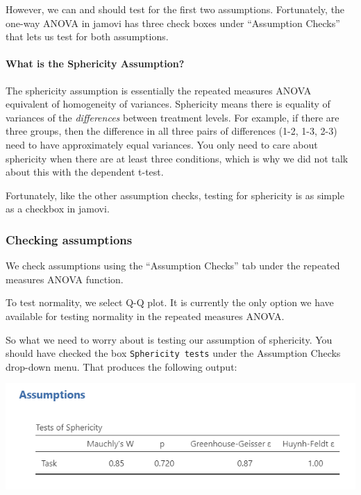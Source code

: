 \documentclass[
]{book}
\begin{document}
However, we can and should test for the first two assumptions. Fortunately, the one-way ANOVA in jamovi has three check boxes under ``Assumption Checks'' that lets us test for both assumptions.

\hypertarget{what-is-the-sphericity-assumption}{%
\paragraph{What is the Sphericity Assumption?}\label{what-is-the-sphericity-assumption}}

The sphericity assumption is essentially the repeated measures ANOVA equivalent of homogeneity of variances. Sphericity means there is equality of variances of the \emph{differences} between treatment levels. For example, if there are three groups, then the difference in all three pairs of differences (1-2, 1-3, 2-3) need to have approximately equal variances. You only need to care about sphericity when there are at least three conditions, which is why we did not talk about this with the dependent t-test.

Fortunately, like the other assumption checks, testing for sphericity is as simple as a checkbox in jamovi.

\hypertarget{checking-assumptions-5}{%
\subsubsection{Checking assumptions}\label{checking-assumptions-5}}

We check assumptions using the ``Assumption Checks'' tab under the repeated measures ANOVA function.

To test normality, we select Q-Q plot. It is currently the only option we have available for testing normality in the repeated measures ANOVA.

So what we need to worry about is testing our assumption of sphericity. You should have checked the box \texttt{Sphericity\ tests} under the Assumption Checks drop-down menu. That produces the following output:

\includegraphics{images/05-repeated-measures-anova/rm-anova_sphericity.png}
\end{document}
